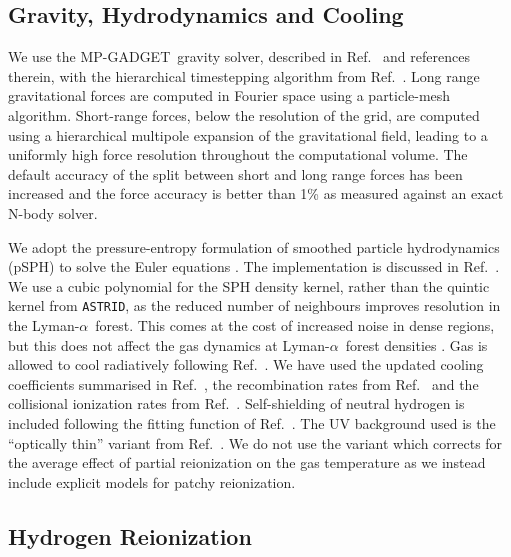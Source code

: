 \documentclass[a4paper,11pt]{article}
\newcommand{\Lya}{Lyman-$\alpha$}
\newcommand{\astrid}{\texttt{ASTRID}}
\newcommand{\mpgadget}{{\small MP-GADGET}}
\begin{document}
\subsection{Gravity, Hydrodynamics and Cooling}
\label{sec:gravity}

We use the \mpgadget~gravity solver, described in Ref.~\cite{Bird:2022} and references therein, with the hierarchical timestepping algorithm from Ref.~\cite{Springel:2021}. Long range gravitational forces are computed in Fourier space using a particle-mesh algorithm. Short-range forces, below the resolution of the grid, are computed using a hierarchical multipole expansion of the gravitational field, leading to a uniformly high force resolution throughout the computational volume. The default accuracy of the split between short and long range forces has been increased and the force accuracy is better than 1\% as measured against an exact N-body solver.

We adopt the pressure-entropy formulation of smoothed particle hydrodynamics (pSPH) to solve the Euler equations \citep{Hopkins:2013,Read:2010}. The implementation is discussed in Ref.~\cite{Feng:2014}. %
We use a cubic polynomial for the SPH density kernel, rather than the quintic kernel from \astrid, as the reduced number of neighbours improves resolution in the \Lya~forest. This comes at the cost of increased noise in dense regions, but this does not affect the gas dynamics at \Lya~forest densities \cite{Bird:2013}.
Gas is allowed to cool radiatively following Ref.~\citep{Katz:1996}.
We have used the updated cooling coefficients summarised in Ref.~\cite{Bolton:2017}, the recombination rates from Ref.~\cite{Verner:1996} and the collisional ionization rates from Ref.~\cite{Voronov:1997}. Self-shielding of neutral hydrogen is included following the fitting function of Ref.~\cite{Rahmati:2013}.
The UV background used is the ``optically thin'' variant from Ref.~\cite{FG2020}. We do not use the variant which corrects for the average effect of partial reionization on the gas temperature as we instead include explicit models for patchy reionization.

\subsection{Hydrogen Reionization}
\label{sec:hydrogen}
\end{document}
